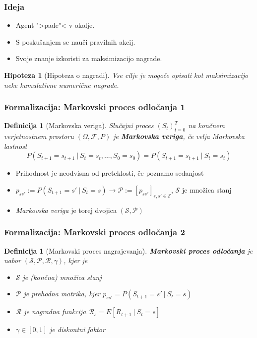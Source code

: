 \documentclass{beamer}    %
\newtheorem{definicija}[izrek]{Definicija}
\newtheorem{hipoteza}[izrek]{Hipoteza}
\begin{document}
    \begin{frame}
        \frametitle{Ideja}
        \begin{itemize}
            \item Agent ">pade"< v okolje. 
            \item S poskušanjem se nauči pravilnih akcij.
            \item Svoje znanje izkoristi za maksimizacijo nagrade.
        \end{itemize}

        \pause
        \medskip
        
        \begin{hipoteza}[Hipoteza o nagradi]
            Vse cilje je mogoče opisati kot maksimizacijo neke kumulativne numerične 
            nagrade.
        \end{hipoteza}

    \end{frame}


\begin{frame}
    \frametitle{Formalizacija: Markovski proces odločanja 1}
    \begin{definicija}[Markovska veriga]
        Slučajni proces $(S_t)_{t=0}^T$ na končnem verjetnostnem prostoru 
        $(\Omega, \mathcal{F},  P)$ je \textbf{Markovska veriga}, če velja Markovska lastnost
        $$
        P(S_{t+1} = s_{t+1}~|~S_{t} = s_{t}, ..., S_0 = s_0) = P(S_{t+1} = s_{t+1}~|~S_{t} = s_{t})
        $$
    \end{definicija}
    \pause
    \medskip
    \begin{itemize}
        \item Prihodnost je neodvisna od preteklosti, če poznamo sedanjost
        \pause
        \item $p_{ss'} := P(S_{t+1} = s'~|~S_{t} = s) \rightarrow
                \mathcal{P} := [p_{ss'}]_{s,s'\in \mathcal{S} }$, $\mathcal{S}$ 
                je množica stanj
        \item \emph{Markovska veriga} je torej dvojica $(\mathcal{S}, \mathcal{P})$
    \end{itemize}
    
\end{frame}


\begin{frame}
    \frametitle{Formalizacija: Markovski proces odločanja 2}
    \begin{definicija}[Markovski proces nagrajevanja]
        \textbf{Markovski proces odločanja} je nabor 
        $(\mathcal{S}, \mathcal{P}, \mathcal{R}, \gamma)$, kjer je
        \begin{itemize}
            \item $\mathcal{S}$ je (končna) množica stanj
            \item $\mathcal{P}$ je prehodna matrika, kjer $p_{ss'} = P(S_{t+1} = s'~|~S_{t} = s)$
            \item $\mathcal{R}$ je nagradna funkcija $\mathcal{R}_s = E[R_{t+1}~|~S_{t} = s]$
            \item $\gamma \in [0, 1]$ je diskontni faktor
        \end{itemize}
    \end{definicija}
\end{frame}
\end{document}
